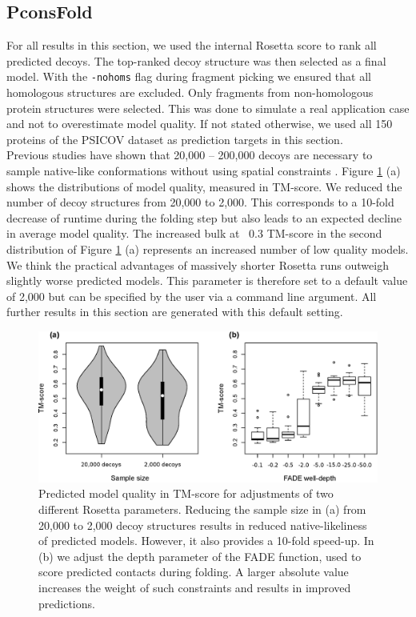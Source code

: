 \documentclass{bioinfo}
\begin{document}
\subsection{PconsFold}
For all results in this section, we used the internal Rosetta score to rank all predicted decoys. The top-ranked decoy structure was then selected as a final model. With the {\tt -nohoms} flag during fragment picking we ensured that all homologous structures are excluded. Only fragments from non-homologous protein structures were selected. This was done to simulate a real application case and not to overestimate model quality. If not stated otherwise, we used all 150 proteins of the PSICOV dataset as prediction targets in this section. \\\indent
Previous studies have shown that 20,000 -- 200,000 decoys are necessary to sample native-like conformations without using spatial constraints \cite[]{rosetta@home, rosetta_folding}. Figure \ref{fig:ros} (a) shows the distributions of model quality, measured in TM-score. We reduced the number of decoy structures from 20,000 to 2,000. This corresponds to a 10-fold decrease of runtime during the folding step but also leads to an expected decline in average model quality. The increased bulk at ~0.3 TM-score in the second distribution of Figure \ref{fig:ros} (a) represents an increased number of low quality models. We think the practical advantages of massively shorter Rosetta runs outweigh slightly worse predicted models. This parameter is therefore set to a default value of 2,000 but can be specified by the user via a command line argument. All further results in this section are generated with this default setting. \\\indent
\begin{figure}[!tpb]%
\centerline{\includegraphics[scale=0.7]{figures/rosetta.eps}}
\caption{Predicted model quality in TM-score for adjustments of two different Rosetta parameters. Reducing the sample size in (a) from 20,000 to 2,000 decoy structures results in reduced native-likeliness of predicted models. However, it also provides a 10-fold speed-up. In (b) we adjust the depth parameter of the FADE function, used to score predicted contacts during folding. A larger absolute value increases the weight of such constraints and results in improved predictions.}\label{fig:ros}
\end{figure}
\end{document}
